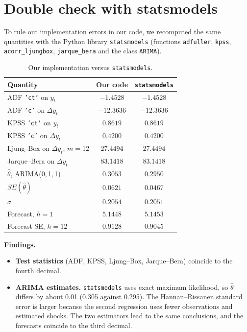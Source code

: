 \documentclass[11pt,a4paper]{article}
\begin{document}
\section{Double check with statsmodels}\label{sec:check}

To rule out implementation errors in our code, we recomputed the same quantities with the Python library \texttt{statsmodels} (functions \texttt{adfuller}, \texttt{kpss}, \texttt{acorr\_ljungbox}, \texttt{jarque\_bera} and the class \texttt{ARIMA}).

\begin{table}[H]
\centering
\begin{tabular}{lcc}
\toprule
Quantity & Our code & \texttt{statsmodels} \\
\midrule
ADF \texttt{'ct'} on $y_t$ & $-1.4528$ & $-1.4528$ \\
ADF \texttt{'c'} on $\Delta y_t$ & $-12.3636$ & $-12.3636$ \\
KPSS \texttt{'ct'} on $y_t$ & $0.8619$ & $0.8619$ \\
KPSS \texttt{'c'} on $\Delta y_t$ & $0.4200$ & $0.4200$ \\
Ljung--Box on $\Delta y_t$, $m=12$ & $27.4494$ & $27.4494$ \\
Jarque--Bera on $\Delta y_t$ & $83.1418$ & $83.1418$ \\
$\hat\theta$, ARIMA(0,\,1,\,1) & $0.3053$ & $0.2950$ \\
$SE(\hat\theta)$ & $0.0621$ & $0.0467$ \\
$\hat\sigma$ & $0.2054$ & $0.2051$ \\
Forecast, $h=1$ & $5.1448$ & $5.1453$ \\
Forecast SE, $h=12$ & $0.9128$ & $0.9045$ \\
\bottomrule
\end{tabular}
\caption{Our implementation versus \texttt{statsmodels}.}
\end{table}

\textbf{Findings.}
\begin{itemize}
\item \textbf{Test statistics} (ADF, KPSS, Ljung--Box, Jarque--Bera) coincide to the fourth decimal.
\item \textbf{ARIMA estimates.} \texttt{statsmodels} uses exact maximum likelihood, so $\hat\theta$ differs by about 0.01 (0.305 against 0.295). The Hannan--Rissanen standard error is larger because the second regression uses fewer observations and estimated shocks. The two estimators lead to the same conclusions, and the forecasts coincide to the third decimal.
\end{itemize}
\end{document}
